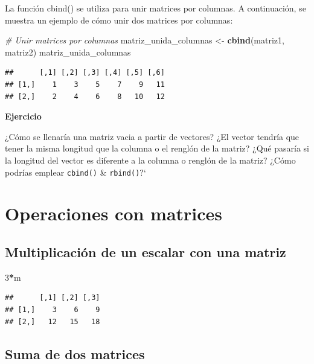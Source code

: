 \documentclass[
]{book}
\newenvironment{Shaded}{\begin{snugshade}}{\end{snugshade}}
\newcommand{\CommentTok}[1]{\textcolor[rgb]{0.56,0.35,0.01}{\textit{#1}}}
\newcommand{\DecValTok}[1]{\textcolor[rgb]{0.00,0.00,0.81}{#1}}
\newcommand{\FunctionTok}[1]{\textcolor[rgb]{0.13,0.29,0.53}{\textbf{#1}}}
\newcommand{\NormalTok}[1]{#1}
\newcommand{\OtherTok}[1]{\textcolor[rgb]{0.56,0.35,0.01}{#1}}
\newcommand{\SpecialCharTok}[1]{\textcolor[rgb]{0.81,0.36,0.00}{\textbf{#1}}}
\begin{document}
La función cbind() se utiliza para unir matrices por columnas. A continuación, se muestra un ejemplo de cómo unir dos matrices por columnas:

\begin{Shaded}
\begin{Highlighting}[]
\CommentTok{\# Unir matrices por columnas}
\NormalTok{matriz\_unida\_columnas }\OtherTok{\textless{}{-}} \FunctionTok{cbind}\NormalTok{(matriz1, matriz2)}
\NormalTok{matriz\_unida\_columnas}
\end{Highlighting}
\end{Shaded}

\begin{verbatim}
##      [,1] [,2] [,3] [,4] [,5] [,6]
## [1,]    1    3    5    7    9   11
## [2,]    2    4    6    8   10   12
\end{verbatim}

\textbf{Ejercicio}

¿Cómo se llenaría una matriz vacia a partir de vectores?
¿El vector tendría que tener la misma longitud que la columna o el renglón de la matriz?
¿Qué pasaría si la longitud del vector es diferente a la columna o renglón de la matriz?
¿Cómo podrías emplear \texttt{cbind()} \& \texttt{rbind()}?{}`

\hypertarget{operaciones-con-matrices}{%
\section{Operaciones con matrices}\label{operaciones-con-matrices}}

\hypertarget{multiplicaciuxf3n-de-un-escalar-con-una-matriz}{%
\subsection{Multiplicación de un escalar con una matriz}\label{multiplicaciuxf3n-de-un-escalar-con-una-matriz}}

\begin{Shaded}
\begin{Highlighting}[]
\DecValTok{3}\SpecialCharTok{*}\NormalTok{m}
\end{Highlighting}
\end{Shaded}

\begin{verbatim}
##      [,1] [,2] [,3]
## [1,]    3    6    9
## [2,]   12   15   18
\end{verbatim}

\hypertarget{suma-de-dos-matrices}{%
\subsection{Suma de dos matrices}\label{suma-de-dos-matrices}}
\end{document}

